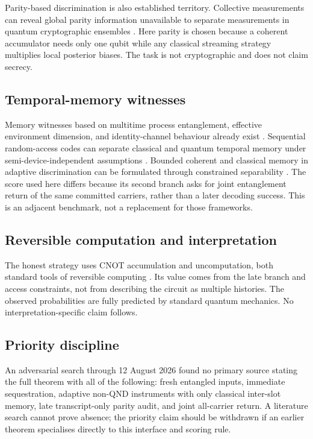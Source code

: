 Parity-based discrimination is also established territory. Collective measurements can reveal global parity information unavailable to separate measurements in quantum cryptographic ensembles \cite{bennett1996parity}. Here parity is chosen because a coherent accumulator needs only one qubit while any classical streaming strategy multiplies local posterior biases. The task is not cryptographic and does not claim secrecy.

\subsection{Temporal-memory witnesses}

Memory witnesses based on multitime process entanglement, effective environment dimension, and identity-channel behaviour already exist \cite{giarmatzi2021memory,vieira2024dimension,sekatski2023memory}. Sequential random-access codes can separate classical and quantum temporal memory under semi-device-independent assumptions \cite{roy2024semidevice}. Bounded coherent and classical memory in adaptive discrimination can be formulated through constrained separability \cite{ohst2026memory}. The score used here differs because its second branch asks for joint entanglement return of the same committed carriers, rather than a later decoding success. This is an adjacent benchmark, not a replacement for those frameworks.

\subsection{Reversible computation and interpretation}

The honest strategy uses CNOT accumulation and uncomputation, both standard tools of reversible computing \cite{bennett1973logical}. Its value comes from the late branch and access constraints, not from describing the circuit as multiple histories. The observed probabilities are fully predicted by standard quantum mechanics. No interpretation-specific claim follows.

\subsection{Priority discipline}

An adversarial search through 12 August 2026 found no primary source stating the full theorem with all of the following: fresh entangled inputs, immediate sequestration, adaptive non-QND instruments with only classical inter-slot memory, late transcript-only parity audit, and joint all-carrier return. A literature search cannot prove absence; the priority claim should be withdrawn if an earlier theorem specialises directly to this interface and scoring rule.

